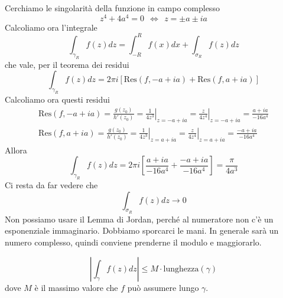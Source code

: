 \begin{figure}[htpb]
\end{figure}
\FloatBarrier

Cerchiamo le singolarità della funzione in campo complesso
\begin{equation*}
z^{4} +4a^{4} =0\ \ \iff \ \ z=\pm a\pm ia
\end{equation*}
Calcoliamo ora l'integrale
\begin{equation*}
\int _{\gamma _{R}} f\left( z\right) dz=\int ^{R}_{-R} f\left( x\right) dx+\int _{\sigma _{R}} f\left( z\right) dz
\end{equation*}
che vale, per il teorema dei residui
\begin{equation*}
\int _{\gamma _{R}} f\left( z\right) dz=2\pi i\left[\mathrm{Res}\left( f,-a+ia\right) +\mathrm{Res}\left( f,a+ia\right)\right]
\end{equation*}
Calcoliamo ora questi residui
\begin{gather*}
\mathrm{Res}\left( f,-a+ia\right) =\frac{g\left( z_{0}\right)}{h'\left( z_{0}\right)} =\left. \frac{1}{4z^{3}}\right| _{z=-a+ia} =\left. \frac{z}{4z^{4}}\right| _{z=-a+ia} =\frac{a+ia}{-16a^{4}}\\
\mathrm{Res}\left( f,a+ia\right) =\frac{g\left( z_{0}\right)}{h'\left( z_{0}\right)} =\left. \frac{1}{4z^{3}}\right| _{z=a+ia} =\left. \frac{z}{4z^{4}}\right| _{z=a+ia} =\frac{-a+ia}{-16a^{4}}
\end{gather*}
Allora
\begin{equation*}
\int _{\gamma _{R}} f\left( z\right) dz=2\pi i\left[\frac{a+ia}{-16a^{4}} +\frac{-a+ia}{-16a^{4}}\right] =\frac{\pi }{4a^{3}}
\end{equation*}
Ci resta da far vedere che
\begin{equation*}
\int _{\sigma _{R}} f\left( z\right) dz\rightarrow 0
\end{equation*}
Non possiamo usare il Lemma di Jordan, perché al numeratore non c'è un esponenziale immaginario. Dobbiamo sporcarci le mani. In generale sarà un numero complesso, quindi conviene prenderne il modulo e maggiorarlo.
\begin{rem}
\begin{equation*}
\left| \int _{\gamma } f\left( z\right) dz\right| \leqslant M\cdotp \text{lunghezza}\left( \gamma \right)
\end{equation*}
dove $M$ è il massimo valore che $f$ può assumere lungo $\gamma $.
\end{rem}
